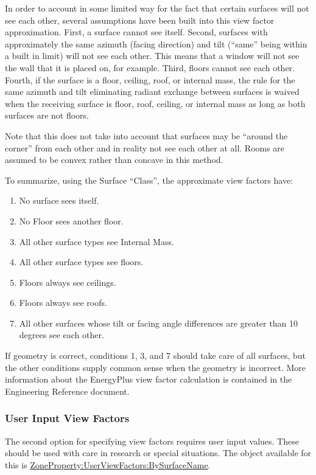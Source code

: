 In order to account in some limited way for the fact that certain surfaces will not see each other, several assumptions have been built into this view factor approximation. First, a surface cannot see itself. Second, surfaces with approximately the same azimuth (facing direction) and tilt (``same'' being within a built in limit) will not see each other. This means that a window will not see the wall that it is placed on, for example. Third, floors cannot see each other. Fourth, if the surface is a floor, ceiling, roof, or internal mass, the rule for the same azimuth and tilt eliminating radiant exchange between surfaces is waived when the receiving surface is floor, roof, ceiling, or internal mass as long as both surfaces are not floors.

Note that this does not take into account that surfaces may be ``around the corner'' from each other and in reality not see each other at all. Rooms are assumed to be convex rather than concave in this method.

To summarize, using the Surface ``Class'', the approximate view factors have:

\begin{enumerate}
  \item
    No surface sees itself.
  \item
    No Floor sees another floor.
  \item
    All other surface types see Internal Mass.
  \item
    All other surface types see floors.
  \item
    Floors always see ceilings.
  \item
    Floors always see roofs.
  \item
    All other surfaces whose tilt or facing angle differences are greater than 10 degrees see each other.
\end{enumerate}

If geometry is correct, conditions 1, 3, and 7 should take care of all surfaces, but the other conditions supply common sense when the geometry is incorrect. More information about the EnergyPlus view factor calculation is contained in the Engineering Reference document.

\subsubsection{User Input View Factors}\label{user-input-view-factors}

The second option for specifying view factors requires user input values. These should be used with care in research or special situations. The object available for this is \hyperref[zonepropertyuserviewfactorsbysurfacename]{ZoneProperty:UserViewFactors:BySurfaceName}.

